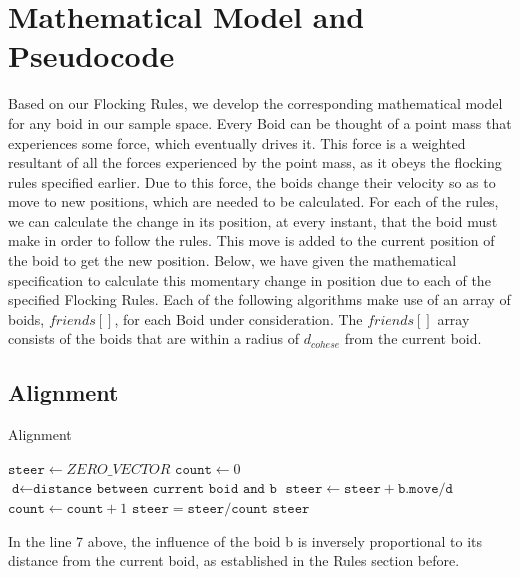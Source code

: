 \documentclass[12pt]{report}
\newcommand{\vars}{\texttt}
\let\oldReturn\Return
\renewcommand{\Return}{\State\oldReturn}
\begin{document}
\newpage
\section*{Mathematical Model and Pseudocode}
Based on our Flocking Rules, we develop the corresponding mathematical model for any boid in our sample space. Every Boid can be thought of a point mass that experiences some force, which eventually drives it. This force is a weighted resultant of all the forces experienced by the point mass, as it obeys the flocking rules specified earlier. Due to this force, the boids change their velocity so as to move to new positions, which are needed to be calculated.
\newline
For each of the rules, we can calculate the change in its position, at every instant, that the boid must make in order to follow the rules. This move is added to the current position of the boid to get the new position.
\newline
Below, we have given the mathematical specification to calculate this momentary change in position due to each of the specified Flocking Rules.
\newline\newline
Each of the following algorithms make use of an array of boids, \(friends[]\), for each Boid under consideration. The \(friends[]\) array consists of the boids that are within a radius of $d_{cohese}$ from the current boid.

\subsection*{Alignment}
\begin{algorithm}
\caption{Alignment}\label{alignment}
\begin{algorithmic}[1]
	\State $\vars{steer} \gets ZERO\_VECTOR$
	\State $\vars{count} \gets 0$
    	\State $\vars{d} \gets \texttt{distance between current boid and b}$
        \If{$\vars{d} > 0$ AND $\vars{d} < d_{align} $}
            \State $\vars{steer} \gets \vars{steer} + \vars{b.move}/\vars{d} $
            \State $\vars{count} \gets \vars{count} + 1 $ 
		\EndIf
	\EndFor
    \If{$\vars{count} > 0$}
        \State $\vars{steer} = \vars{steer}/\vars{count}$
    \EndIf
    \Return $\vars{steer}$
\EndFunction
\end{algorithmic}
\end{algorithm}
In the line 7 above, the influence of the boid b is inversely proportional to its distance from the current boid, as established in the Rules section before. 
\end{document}
